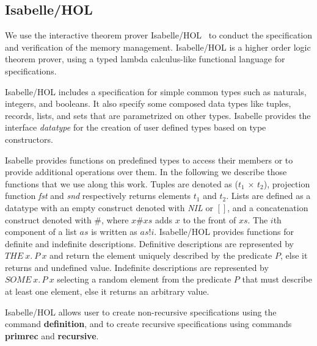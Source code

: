 \subsection{Isabelle/HOL}
We use the interactive theorem prover Isabelle/HOL~\cite{reg_Isabelle/HOL} to conduct the specification and verification of the memory management. Isabelle/HOL is a higher order logic theorem prover, using a typed lambda calculus-like functional language for specifications. 

Isabelle/HOL includes a specification for simple common types such as naturals, integers, and booleans. It also specify some composed data types like tuples, records, lists, and sets that are parametrized on other types. Isabelle provides the interface \emph{datatype} for the creation of user defined types based on type constructors. 

Isabelle provides functions on predefined types to access their members or to provide additional operations over them. In the following we describe those functions that we use along this work. Tuples are denoted as (\emph{$t_1$} $\times$ \emph{$t_2$}), projection function \emph{fst} and \emph{snd} respectively returns elements $t_1$ and $t_2$. Lists are defined as a datatype with an empty construct denoted with \emph{NIL} or $[]$, and a concatenation construct denoted with $\#$, where $x\#xs$ adds $x$ to the front of $xs$. The $i$th component of a list $as$ is written as $as!i$. Isabelle/HOL provides functions for definite and indefinite descriptions. Definitive descriptions are represented by $THE\ x.\ P\ x$ and return the element uniquely described by the predicate $P$, else it returns and undefined value. Indefinite descriptions are represented by $SOME\ x.\, P\ x$ selecting a random element from the predicate $P$ that must describe at least one element, else it returns an arbitrary value.

Isabelle/HOL allows user to create non-recursive specifications using the command \textbf{definition}, and to create recursive specifications using commands \textbf{primrec} and \textbf{recursive}.

